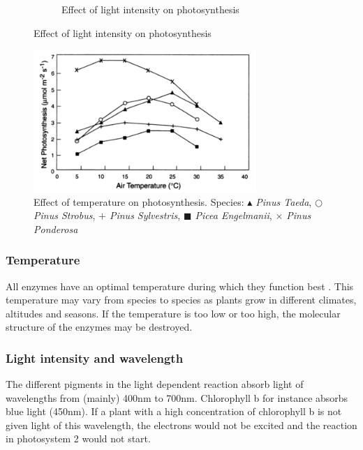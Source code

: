 \begin{figure}
\begin{subfigure}[b]{0.45\textwidth}
                \caption{Effect of light intensity on photosynthesis}
                \label{fig:lightintensity}
        \end{subfigure}
       
\end{figure}

\begin{figure}
\centering
\includegraphics[width=0.75\textwidth]{img/photosynthesis/temperature_new.png}
\caption{Effect of temperature on photosynthesis. Species:
 \textit{\ensuremath{\blacktriangle} Pinus Taeda},  
\textit{\ensuremath{\bigcirc} Pinus Strobus}, 
\textit{\ensuremath{+} Pinus Sylvestris}, 
\textit{\ensuremath{\blacksquare} Picea Engelmanii}, 
\textit{\ensuremath{\times} Pinus Ponderosa}
\citep{hollinger1995external}
}
\label{fig:temperature}
\end{figure}

\subsubsection{Temperature}
All enzymes have an optimal temperature during which they function best \citep{bios}. This temperature may vary from species to species as plants grow in different climates, altitudes and seasons. If the temperature is too low or too high, the molecular structure of the enzymes may be destroyed.

\subsubsection{Light intensity and wavelength}
The different pigments in the light dependent reaction absorb light of wavelengths from (mainly) 400nm to 700nm. Chlorophyll b for instance absorbs blue light (450nm). If a plant with a high concentration of chlorophyll b is not given light of this wavelength, the electrons would not be excited and the reaction in photosystem 2 would not start.

